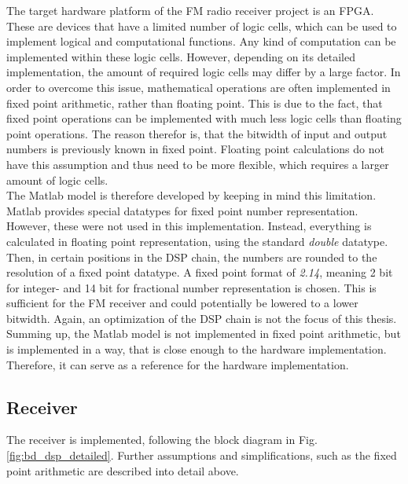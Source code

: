 The target hardware platform of the FM radio receiver project is an FPGA.
These are devices that have a limited number of logic cells, which can be used to implement logical and computational functions.
Any kind of computation can be implemented within these logic cells.
However, depending on its detailed implementation, the amount of required logic cells may differ by a large factor.
In order to overcome this issue, mathematical operations are often implemented in fixed point arithmetic, rather than floating point.
This is due to the fact, that fixed point operations can be implemented with much less logic cells than floating point operations.
The reason therefor is, that the bitwidth of input and output numbers is previously known in fixed point.
Floating point calculations do not have this assumption and thus need to be more flexible, which requires a larger amount of logic cells.\\

The Matlab model is therefore developed by keeping in mind this limitation.
Matlab provides special datatypes for fixed point number representation.
However, these were not used in this implementation.
Instead, everything is calculated in floating point representation, using the standard \textit{double} datatype.
Then, in certain positions in the DSP chain, the numbers are rounded to the resolution of a fixed point datatype.
A fixed point format of \textit{2.14}, meaning 2 bit for integer- and 14 bit for fractional number representation is chosen.
This is sufficient for the FM receiver and could potentially be lowered to a lower bitwidth.
Again, an optimization of the DSP chain is not the focus of this thesis.\\

Summing up, the Matlab model is not implemented in fixed point arithmetic, but is implemented in a way, that is close enough to the hardware implementation.
Therefore, it can serve as a reference for the hardware implementation.


\subsection{Receiver}

The receiver is implemented, following the block diagram in Fig.\ref{fig:bd_dsp_detailed}.
Further assumptions and simplifications, such as the fixed point arithmetic are described into detail above.

